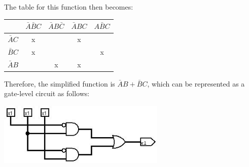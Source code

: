 \documentclass[12pt]{article}
\begin{document}
The table for this function then becomes:

\begin{center}
	\begin{tabular}{| c | c c c c |}
		\hline
		                    & \textbf{$\bar{A}\bar{B}C$} & \textbf{$\bar{A}B\bar{C}$} & \textbf{$\bar{A}BC$} & \textbf{$A\bar{B}C$} \\
		\hline
		\textbf{$\bar{A}C$} & x                          &                            & x                    &                      \\
		\textbf{$\bar{B}C$} & x                          &                            &                      & x                    \\
		\textbf{$\bar{A}B$} &                            & x                          & x                    &                      \\
		\hline
	\end{tabular}
\end{center}

Therefore, the simplified function is $\bar{A}B + \bar{B}C$, which can be represented as a gate-level circuit as follows:

\begin{center}
	\includegraphics[width=8cm]{cs215_hw3_optimized.jpg}
\end{center}
\end{document}
